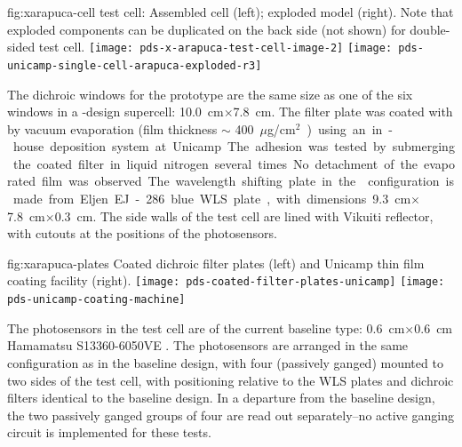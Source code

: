 \begin{dunefigure}{fig:xarapuca-cell}
{ test cell:  Assembled cell (left); exploded model (right).  Note that exploded components can be duplicated on the back side (not shown) for double-sided test cell.} 
	\texttt{[image: pds-x-arapuca-test-cell-image-2]}
	    \texttt{[image: pds-unicamp-single-cell-arapuca-exploded-r3]}
\end{dunefigure}


The dichroic windows for the prototype are the same size as one of the six windows in a -design  supercell: \SI{10.0}{cm}$\times$\SI{7.8}{cm}. The filter plate was coated with  by vacuum evaporation (film thickness $\sim$ \SI{400}{${\mu}$g/cm$^2$})  using an in-house deposition system at Unicamp. The adhesion was tested by submerging the coated filter in liquid nitrogen several times. No detachment of the evaporated film was observed.
The wavelength shifting plate in the  configuration is made from Eljen EJ-286 blue WLS plate, with dimensions \SI{9.3}{cm}$\times$\SI{7.8}{cm}$\times$\SI{0.3}{cm}.  The side walls of the test cell are lined with Vikuiti reflector, with cutouts at the positions of the photosensors.

\begin{dunefigure}{fig:xarapuca-plates}
{Coated dichroic filter plates (left) and Unicamp thin film coating facility (right).} 
	\texttt{[image: pds-coated-filter-plates-unicamp]}\quad
	\texttt{[image: pds-unicamp-coating-machine]}
\end{dunefigure}

The photosensors in the test cell are of the current baseline type:  \SI{0.6}{cm}$\times$\SI{0.6}{cm} Hamamatsu S13360-6050VE .  The photosensors are arranged in the same configuration as in the baseline design, with four  (passively ganged) mounted to two sides of the test cell, with positioning relative to the WLS plates and dichroic filters identical to the baseline design.  In a departure from the baseline design, the two passively ganged groups of four  are read out separately--no active ganging circuit is implemented for these tests. 

